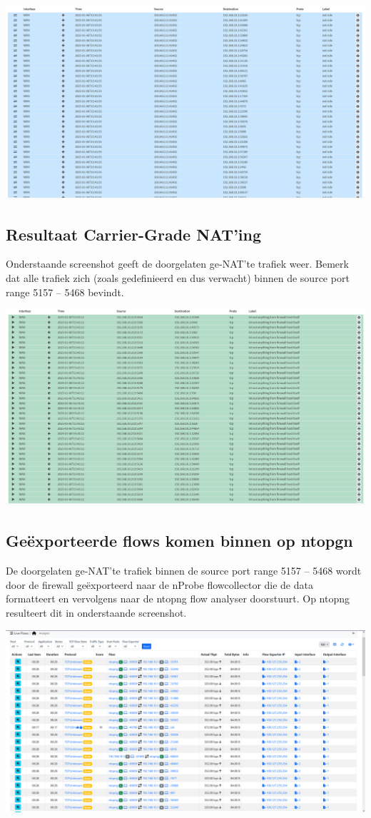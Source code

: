 \includegraphics[width=\textwidth]{graphics/nmap_nat_table.PNG}

\subsection{Resultaat Carrier-Grade NAT’ing}
Onderstaande screenshot geeft de doorgelaten ge-NAT’te trafiek weer. Bemerk dat alle trafiek zich (zoals gedefinieerd en dus verwacht) binnen de source port range 5157 – 5468 bevindt.

\includegraphics[width=\textwidth]{graphics/nmap_firewall_table.PNG}

\subsection{Geëxporteerde flows komen binnen op ntopgn}
De doorgelaten ge-NAT’te trafiek binnen de source port range 5157 – 5468 wordt door de firewall geëxporteerd naar de nProbe flowcollector die de data formatteert en vervolgens naar de ntopng flow analyser doorstuurt. Op ntopng resulteert dit in onderstaande screenshot.

\includegraphics[width=\textwidth]{graphics/nmap_scan_flows.PNG}

